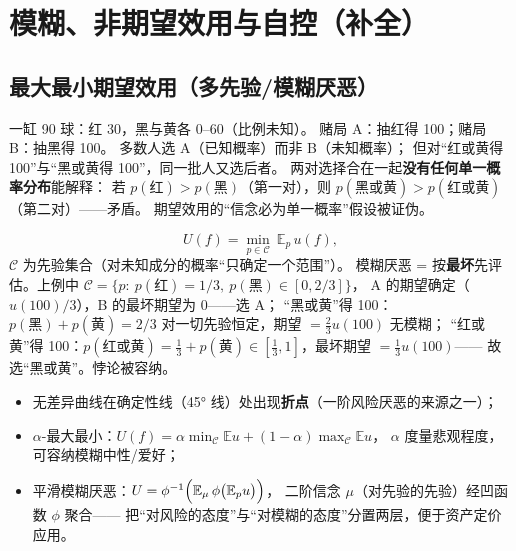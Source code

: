 \section{模糊、非期望效用与自控（补全）}

\subsection{最大最小期望效用（多先验/模糊厌恶）}\label{subsec:meu}

一缸 90 球：红 30，黑与黄各 0--60（比例未知）。
赌局 A：抽红得 100；赌局 B：抽黑得 100。
多数人选 A（已知概率）而非 B（未知概率）；
但对“红或黄得 100”与“黑或黄得 100”，同一批人又选后者。
两对选择合在一起\textbf{没有任何单一概率分布}能解释：
若 $p(\text{红})>p(\text{黑})$（第一对），则 $p(\text{黑或黄})>p(\text{红或黄})$（第二对）——矛盾。
期望效用的“信念必为单一概率”假设被证伪。

\[
U(f)=\min_{p\in\mathcal{C}}\ \mathbb{E}_p\,u(f),
\]
$\mathcal{C}$ 为先验集合（对未知成分的概率“只确定一个范围”）。
模糊厌恶 = 按\textbf{最坏}先评估。上例中
$\mathcal{C}=\{p:\ p(\text{红})=1/3,\ p(\text{黑})\in[0,2/3]\}$，
A 的期望确定（$u(100)/3$），B 的最坏期望为 $0$——选 A；
“黑或黄”得 100：$p(\text{黑})+p(\text{黄})=2/3$ 对一切先验恒定，期望 $=\frac23u(100)$ 无模糊；
“红或黄”得 100：$p(\text{红或黄})=\frac13+p(\text{黄})\in[\frac13,1]$，最坏期望 $=\frac13u(100)$——
故选“黑或黄”。悖论被容纳。

\begin{itemize}
  \item 无差异曲线在确定性线（45° 线）处出现\textbf{折点}（一阶风险厌恶的来源之一）；
  \item $\alpha$-最大最小：$U(f)=\alpha\min_{\mathcal{C}}\mathbb{E}u+(1-\alpha)\max_{\mathcal{C}}\mathbb{E}u$，
        $\alpha$ 度量悲观程度，可容纳模糊中性/爱好；
  \item 平滑模糊厌恶：$U=\phi^{-1}\Bigl(\mathbb{E}_{\mu}\,\phi\bigl(\mathbb{E}_p u\bigr)\Bigr)$，
        二阶信念 $\mu$（对先验的先验）经凹函数 $\phi$ 聚合——
        把“对风险的态度”与“对模糊的态度”分置两层，便于资产定价应用。
\end{itemize}

